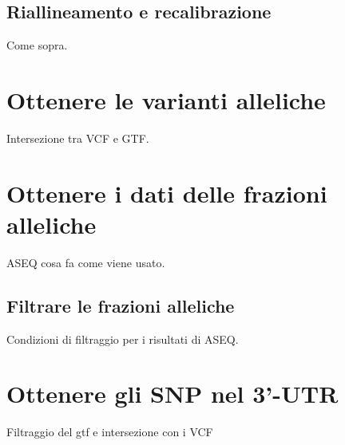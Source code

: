     \subsection{Riallineamento e recalibrazione}
    \label{subsec:recalibration}
    Come sopra.

  \section{Ottenere le varianti alleliche}
  Intersezione tra VCF e GTF.

  \section{Ottenere i dati delle frazioni alleliche}
  \label{sec:aseq}
  ASEQ cosa fa come viene usato.


    \subsection{Filtrare le frazioni alleliche}
    \label{subsec:filter}
    Condizioni di filtraggio per i risultati di ASEQ.

  \section{Ottenere gli SNP nel 3'-UTR}
  \label{sec:threeprime}
  Filtraggio del gtf e intersezione con i VCF
